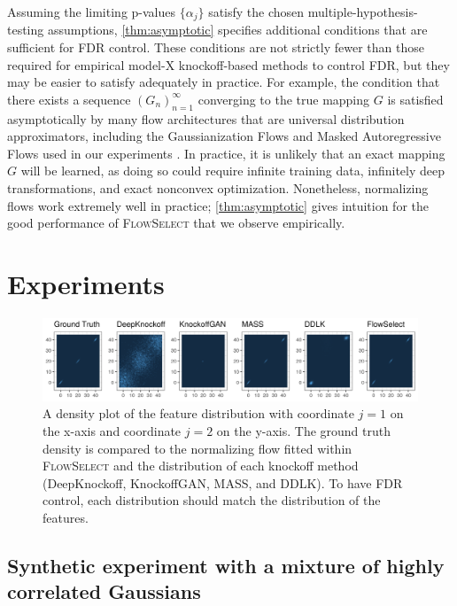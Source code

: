 \documentclass{article}
\newcommand{\FlowSelect}{\textsc{FlowSelect}\xspace}
\begin{document}
Assuming the limiting p-values $\{\alpha_j\}$ satisfy the chosen multiple-hypothesis-testing assumptions, 
\cref{thm:asymptotic} specifies additional conditions that are sufficient for FDR control.
These conditions are not strictly fewer than those required for empirical model-X knockoff-based methods to control FDR, but they may be easier to satisfy adequately in practice.
For example, the condition that there exists a sequence $(G_n)_{n=1}^\infty$ converging to the true mapping $G$ is satisfied asymptotically by many flow architectures that are universal distribution approximators, including the Gaussianization Flows and Masked Autoregressive Flows used in our experiments \citep{huangNeuralAutoregressiveFlows2018a,mengGaussianizationFlows2020b, kobyzevNormalizingFlowsIntroduction2020}.
In practice, it is unlikely that an exact mapping $G$ will be learned, as doing so could require infinite training data, infinitely deep transformations, and exact nonconvex optimization.
Nonetheless, normalizing flows work extremely well in practice; \cref{thm:asymptotic} gives intuition for the good performance of \FlowSelect that we observe empirically.

\section{Experiments}
\begin{figure}
    \centering
    \includegraphics[width=\linewidth]{./fig/knockoff_compare_heatmap_onerow.png}
    \caption{A density plot of the feature distribution with coordinate $j=1$ on the x-axis and coordinate $j=2$ on the y-axis. The ground truth density is compared to the normalizing flow fitted within \FlowSelect and the distribution of each knockoff method (DeepKnockoff, KnockoffGAN, MASS, and DDLK). To have FDR control, each distribution should match the distribution of the features.}
    \label{fig:linear_knockoff_distributions}
\end{figure}
\label{sec:experiments}



\subsection{Synthetic experiment with a mixture of highly correlated Gaussians}\label{sec:gaussian}
\end{document}

